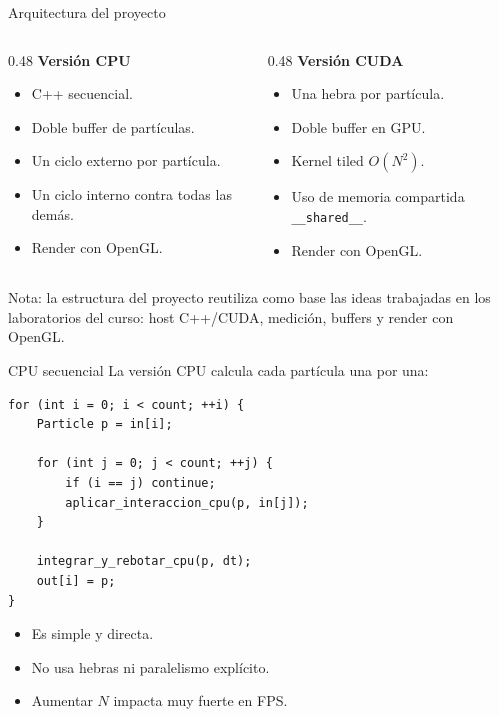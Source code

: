 \documentclass[aspectratio=169]{beamer}
\begin{document}
\begin{frame}{Arquitectura del proyecto}
    \begin{columns}
        \begin{column}{0.48\textwidth}
            \textbf{Versión CPU}
            \begin{itemize}
                \item C++ secuencial.
                \item Doble buffer de partículas.
                \item Un ciclo externo por partícula.
                \item Un ciclo interno contra todas las demás.
                \item Render con OpenGL.
            \end{itemize}
        \end{column}

        \begin{column}{0.48\textwidth}
            \textbf{Versión CUDA}
            \begin{itemize}
                \item Una hebra por partícula.
                \item Doble buffer en GPU.
                \item Kernel tiled $O(N^2)$.
                \item Uso de memoria compartida \texttt{\_\_shared\_\_}.
                \item Render con OpenGL.
            \end{itemize}
        \end{column}
    \end{columns}

    \vfill
    {\scriptsize Nota: la estructura del proyecto reutiliza como base las ideas trabajadas en los laboratorios del curso: host C++/CUDA, medición, buffers y render con OpenGL.}
\end{frame}

\begin{frame}[fragile]{CPU secuencial}
    La versión CPU calcula cada partícula una por una:

\begin{verbatim}
for (int i = 0; i < count; ++i) {
    Particle p = in[i];

    for (int j = 0; j < count; ++j) {
        if (i == j) continue;
        aplicar_interaccion_cpu(p, in[j]);
    }

    integrar_y_rebotar_cpu(p, dt);
    out[i] = p;
}
\end{verbatim}

    \begin{itemize}
        \item Es simple y directa.
        \item No usa hebras ni paralelismo explícito.
        \item Aumentar $N$ impacta muy fuerte en FPS.
    \end{itemize}
\end{frame}
\end{document}
